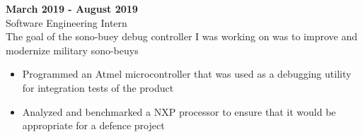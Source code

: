 {\begin{minipage}{\linewidth}
\end{minipage}
\vspace{\entrySpacing}

    \noindent\begin{minipage}{\linewidth}
 \hfill \textbf{March 2019 - August 2019}\\
Software Engineering Intern\hfill \\The goal of the sono-buey debug controller I was working on was to improve and modernize military sono-beuys
\begin{itemize}[noitemsep,nolistsep]
\item Programmed an Atmel microcontroller that was used as a debugging utility for integration tests of the product
\item Analyzed and benchmarked a NXP processor to ensure that it would be appropriate for a defence project
\end{itemize}


\end{minipage}
\vspace{\entrySpacing}

  }

